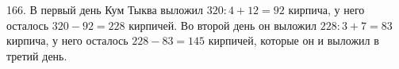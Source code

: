 166. В первый день Кум Тыква выложил $320:4+12=92$ кирпича, у него осталось $320-92=228$ кирпичей. Во второй день он выложил $228:3+7=83$ кирпича, у него осталось $228-83=145$ кирпичей, которые он и выложил в третий день.\\
